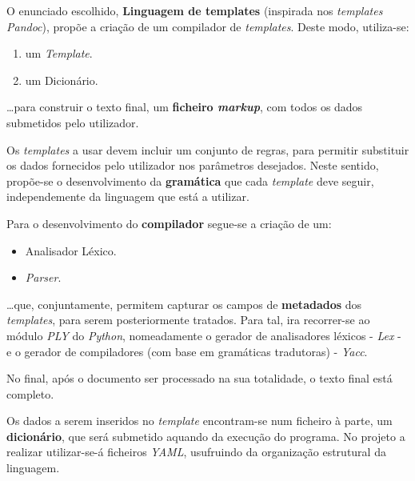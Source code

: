 \documentclass[../relatorio.tex]{subfiles}
\begin{document}
O enunciado escolhido, \textbf{Linguagem de templates} 
(inspirada nos \textit{templates Pandoc}),
propõe a criação de um compilador de \textit{templates}.
Deste modo, utiliza-se:
\begin{enumerate}
    \item um \textit{Template}.
    \item um Dicionário.
\end{enumerate}
\dots para construir o texto final, um \textbf{ficheiro \textit{markup}}, 
com todos os dados submetidos pelo utilizador.  

Os \textit{templates} a usar
devem incluir um conjunto de regras, para permitir 
substituir os dados fornecidos pelo utilizador 
nos parâmetros desejados. 
Neste sentido, propõe-se o desenvolvimento da \textbf{gramática}
que cada \textit{template} deve seguir, 
independemente da linguagem que está a utilizar.

Para o desenvolvimento do \textbf{compilador} segue-se a criação de um:
\begin{itemize}
    \item Analisador Léxico. 
    \item \textit{Parser}.
\end{itemize}
\dots que, conjuntamente, permitem capturar os campos de 
\textbf{metadados} dos \textit{templates}, para serem 
posteriormente tratados.
Para tal, ira recorrer-se ao módulo \textit{PLY} do \textit{Python},
nomeadamente o gerador de analisadores léxicos - \textit{Lex} - e
o gerador de compiladores (com base em gramáticas tradutoras) - \textit{Yacc}.

No final, após o documento ser processado na sua totalidade,
o texto final está completo.

Os dados a serem inseridos no \textit{template}
encontram-se num ficheiro à parte, um \textbf{dicionário},
que será submetido aquando da execução do programa. 
No projeto a realizar utilizar-se-á ficheiros 
\textit{YAML}, usufruindo da organização estrutural da linguagem.
\end{document}

